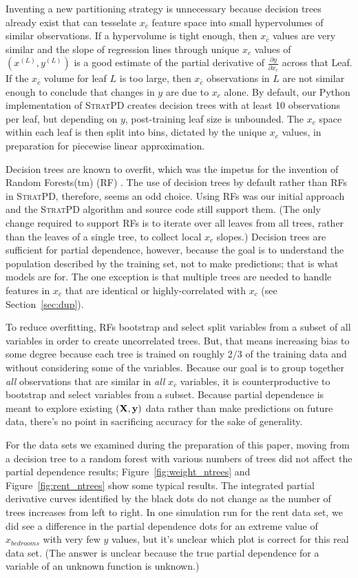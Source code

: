 \documentclass[12pt]{article}
\newcommand{\secref}[1]{Section~\ref{#1}}
\newcommand{\figref}[1]{Figure~\ref{#1}}
\newcommand{\spd}{\fontfamily{cmr}\textsc{\small StratPD}}
\newcommand{\xnc}{$x_{\overline{c}}$}
\begin{document}
Inventing a new partitioning strategy is unnecessary because decision trees already exist that can tesselate \xnc{} feature space into small hypervolumes of similar observations. If a hypervolume is tight enough, then \xnc{} values are very similar and the slope of regression lines through unique $x_c$ values of $(x^{(L)}, y^{(L)})$ is a good estimate of the partial derivative of $\frac{\partial y}{\partial x_{c}}$ across that Leaf.  If the \xnc{} volume for leaf $L$ is too large, then \xnc{} observations in $L$ are not similar enough to conclude that changes in $y$ are due to $x_c$ alone. By default, our Python implementation of \spd{} creates decision trees with at least 10 observations per leaf, but depending on $y$, post-training leaf size is unbounded. The $x_c$ space within each leaf is then split into bins, dictated by the unique $x_c$ values, in preparation for piecewise linear approximation.

Decision trees are known to overfit, which was the impetus for the invention of Random Forests(tm) (RF) \cite{RF}.  The use of decision trees by default rather than RFs in \spd, therefore, seems an odd choice. Using RFs was our initial approach and the \spd{} algorithm and source code still support them. (The only change required to support RFs is to iterate over all leaves from all trees, rather than the leaves of a single tree, to collect local $x_c$ slopes.)  Decision trees are sufficient for partial dependence, however, because the goal is to understand the population described by the training set, not to make predictions; that is what models are for. The one exception is that multiple trees are needed to handle features in \xnc{} that are identical or highly-correlated with $x_c$ (see \secref{sec:dup}).

To reduce overfitting, RFs bootstrap and select split variables from a subset of all variables in order to create uncorrelated trees. But, that means increasing bias to some degree because each tree is trained on roughly 2/3 of the training data and without considering some of the variables. Because our goal is to group together {\em all} observations that are similar in {\em all} \xnc{} variables, it is counterproductive to bootstrap and select variables from a subset. Because partial dependence is meant to explore existing $(\bf X, y)$ data rather than make predictions on future data, there's no point in sacrificing accuracy for the sake of generality. 

For the data sets we examined during the preparation of this paper, moving from a decision tree to a random forest with various numbers of trees did not affect the partial dependence results; \figref{fig:weight_ntrees} and \figref{fig:rent_ntrees} show some typical results. The integrated partial derivative curves identified by the black dots do not change as the number of trees increases from left to right.  In one simulation run for the rent data set, we did see a difference in the partial dependence dots for an extreme value of $x_{bedrooms}$ with very few $y$ values, but it's unclear which plot is correct for this real data set. (The answer is unclear because the true partial dependence for a variable of an unknown function is unknown.)
\end{document}
